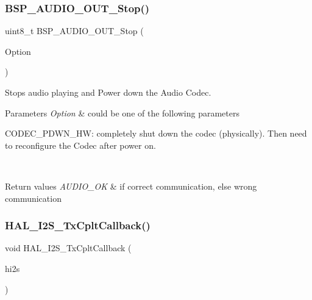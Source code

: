 \subsubsection{\texorpdfstring{B\+S\+P\+\_\+\+A\+U\+D\+I\+O\+\_\+\+O\+U\+T\+\_\+\+Stop()}{BSP\_AUDIO\_OUT\_Stop()}}
{\footnotesize\ttfamily uint8\+\_\+t B\+S\+P\+\_\+\+A\+U\+D\+I\+O\+\_\+\+O\+U\+T\+\_\+\+Stop (\begin{DoxyParamCaption}\item[{uint32\+\_\+t}]{Option }\end{DoxyParamCaption})}



Stops audio playing and Power down the Audio Codec. 


\begin{DoxyParams}{Parameters}
{\em Option} & could be one of the following parameters
\begin{DoxyItemize}
\item C\+O\+D\+E\+C\+\_\+\+P\+D\+W\+N\+\_\+\+HW\+: completely shut down the codec (physically). Then need to reconfigure the Codec after power on. ~\newline

\end{DoxyItemize}\\
\hline
\end{DoxyParams}

\begin{DoxyRetVals}{Return values}
{\em A\+U\+D\+I\+O\+\_\+\+OK} & if correct communication, else wrong communication \\
\hline
\end{DoxyRetVals}
\mbox{\label{group___s_t_m32_f4___d_i_s_c_o_v_e_r_y___a_u_d_i_o___o_u_t___private___functions_ga1ef4021384eddbd41ca60454a2483bf3}} 
\subsubsection{\texorpdfstring{H\+A\+L\+\_\+\+I2\+S\+\_\+\+Tx\+Cplt\+Callback()}{HAL\_I2S\_TxCpltCallback()}}
{\footnotesize\ttfamily void H\+A\+L\+\_\+\+I2\+S\+\_\+\+Tx\+Cplt\+Callback (\begin{DoxyParamCaption}\item[{I2\+S\+\_\+\+Handle\+Type\+Def $\ast$}]{hi2s }\end{DoxyParamCaption})}



